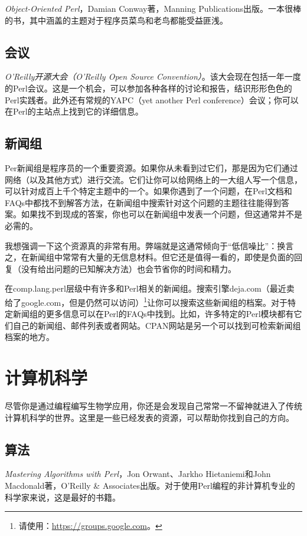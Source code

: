 \textit{Object-Oriented Perl}，Damian Conway著，Manning Publications出版。一本很棒的书，其中涵盖的主题对于程序员菜鸟和老鸟都能受益匪浅。

\subsection{会议}
\textit{O'Reilly开源大会（O'Reilly Open Source Convention）}。该大会现在包括一年一度的Perl会议。这是一个机会，可以参加各种各样的讨论和报告，结识形形色色的Perl实践者。此外还有常规的YAPC（yet another Perl conference）会议；你可以在Perl的主站点上找到它的详细信息。

\subsection{新闻组}
Per新闻组是程序员的一个重要资源。如果你从未看到过它们，那是因为它们通过网络（以及其他方式）进行交流。它们让你可以给网络上的一大组人写一个信息，可以针对成百上千个特定主题中的一个。如果你遇到了一个问题，在Perl文档和FAQs中都找不到解答方法，在新闻组中搜索针对这个问题的主题往往能得到答案。如果找不到现成的答案，你也可以在新闻组中发表一个问题，但这通常并不是必需的。

我想强调一下这个资源真的非常有用。弊端就是这通常倾向于“低信噪比”：换言之，在新闻组中常常有大量的无信息材料。但它还是值得一看的，即使是负面的回复（没有给出问题的已知解决方法）也会节省你的时间和精力。

在comp.lang.perl层级中有许多和Perl相关的新闻组。搜索引擎deja.com（最近卖给了google.com，但是仍然可以访问）\footnote{请使用：\href{https://groups.google.com}{https://groups.google.com}。}让你可以搜索这些新闻组的档案。对于特定新闻组的更多信息可以在Perl的FAQs中找到。比如，许多特定的Perl模块都有它们自己的新闻组、邮件列表或者网站。CPAN网站是另一个可以找到可检索新闻组档案的地方。

\section{计算机科学}
尽管你是通过编程编写生物学应用，你还是会发现自己常常一不留神就进入了传统计算机科学的世界。这里是一些已经发表的资源，可以帮助你找到自己的方向。

\subsection{算法}
\textit{Mastering Algorithms with Perl}，Jon Orwant、Jarkho Hietaniemi和John Macdonald著，O'Reilly \& Associates出版。对于使用Perl编程的非计算机专业的科学家来说，这是最好的书籍。

